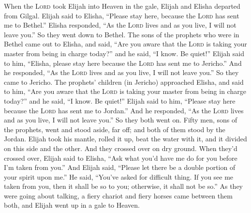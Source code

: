 
\begin{inparaenum}
   When the \textsc{Lord} took Elijah into Heaven in the gale, Elijah and Elisha departed from Gilgal.%
   Elijah said to Elisha, ``Please stay here, because the \textsc{Lord} has sent me to Bethel.'' Elisha responded, ``As the \textsc{Lord} lives and as you live, I will not leave you.'' So they went down to Bethel.%
   The sons of the prophets who were in Bethel came out to Elisha, and said, ``Are you aware that the \textsc{Lord} is taking your master from being in charge today?'' and he said, ``I know. Be quiet!''%
   Elijah said to him, ``Elisha, please stay here because the \textsc{Lord} has sent me to Jericho.'' And he responded, ``As the \textsc{Lord} lives and as you live, I will not leave you.'' So they came to Jericho.%
   The prophets' children (in Jericho) approached Elisha, and said to him, ``Are you aware that the \textsc{Lord} is taking your master from being in charge today?'' and he said, ``I know. Be quiet!''%
   Elijah said to him, ``Please stay here because the \textsc{Lord} has sent me to Jordan.'' And he responded, ``As the \textsc{Lord} lives and as you live, I will not leave you.'' So they both went on.%
   Fifty men, sons of the prophets, went and stood aside, far off; and both of them stood by the Jordan.%
   Elijah took his mantle, rolled it up, beat the water with it, and it divided on this side and the other. And they crossed over on dry ground.%
   When they'd crossed over, Elijah said to Elisha, ``Ask what you'd have me do for you before I'm taken from you.'' And Elijah said, ``Please let there be a double portion of your spirit upon me.''%
   He said, ``You've asked for difficult thing. If you see me taken from you, then it shall be so to you; otherwise, it shall not be so.''%
   As they were going about talking, a fiery chariot and fiery horses came between them both, and Elijah went up in a gale to Heaven.%

\end{inparaenum}
